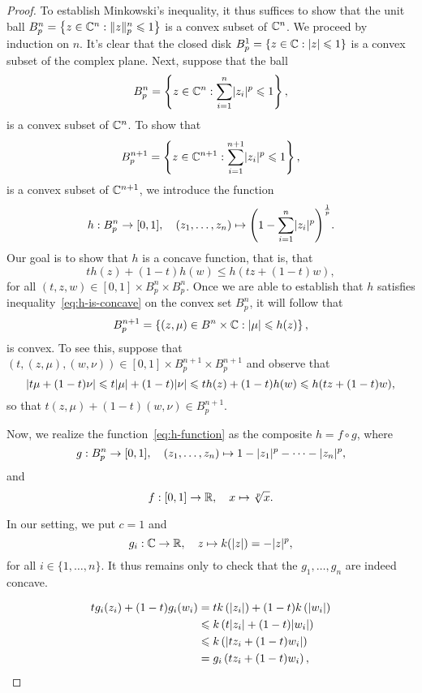 \begin{proof}
To establish Minkowski's inequality, it thus suffices to show that the unit
ball
\(B^{n}_{p}=\left\{z\in\complexfield^{n}:\norm<n>(p)[z]\leqslant{1}\right\}\)
is a convex subset of \(\mathbb{C}^{n}\). We proceed by induction on \(n\).
It's clear that the closed disk
\(B^{1}_{p}=\left\{z\in\mathbb{C}:\lvert z\rvert\leqslant{1}\right\}\) is a convex
subset of the complex plane. Next, suppose that the ball
\[
  B^{n}_{p}
  =
  \left\{z\in\mathbb{C}^{n}:\sum_{i=1}^{n}\lvert z_{i}\rvert^{p}\leqslant{1}\right\},
\]
is a convex subset of \(\mathbb{C}^{n}\). To show that
\[
  B^{n+1}_{p}
  =
  \left\{z\in\mathbb{C}^{n+1}:\sum_{i=1}^{n+1}\lvert z_{i}\rvert^{p}\leqslant{1}\right\},
\]
is a convex subset of \(\mathbb{C}^{n+1}\), we introduce the function
\begin{equation}\label{eq:h-function}
  h:B^{n}_{p}\to{[0,1]},
  \quad{(z_{1},\ldots,z_{n})\mapsto\left(1-\sum_{i=1}^{n}\lvert z_{i}\rvert^{p}\right)^{\frac{1}{p}}}.
\end{equation}
Our goal is to show that \(h\) is a concave function, that is, that
\begin{equation}\label{eq:h-is-concave}
	th(z)+(1-t)h(w)\leqslant{h(tz+(1-t)w)},
\end{equation}
for all \((t,z,w)\in{[0,1]\times{B^{n}_{p}}\times{B^{n}_{p}}}\). Once we are
able to establish that \(h\) satisfies inequality~\eqref{eq:h-is-concave} on
the convex set \(B^{n}_{p}\), it will follow that
\[
	B^{n+1}_{p}
  =
  \left\{(z,\mu)\in{B^{n}\times\mathbb{C}}:\lvert\mu\rvert\leqslant{h(z)}\right\},
\]
is convex. To see this, suppose that
\((t,(z,\mu),(w,\nu))\in{[0,1]\times{B^{n+1}_{p}}\times{B^{n+1}_{p}}}\) and
observe that
\[
	\lvert t\mu+(1-t)\nu\rvert
  \leqslant{t\lvert\mu\rvert+(1-t)\lvert\nu\rvert}
  \leqslant{th(z)+(1-t)h(w)}
  \leqslant{h(tz+(1-t)w}),
\]
so that \(t(z,\mu)+(1-t)(w,\nu)\in{B^{n+1}_{p}}\).

Now, we realize the function~\eqref{eq:h-function} as the composite
\(h=f\circ{g}\), where
\begin{equation}\label{eq:g-function}
  g:B^{n}_{p}\to[0,1],
  \quad{(z_{1},\ldots,z_{n})\mapsto{1-\lvert z_{1}\rvert^{p}-\cdots-\lvert z_{n}\rvert^{p}}},
\end{equation}
and
\begin{equation}\label{eq:f-function}
  f:[0,1]\to\mathbb{R},\quad{x\mapsto{\sqrt[p]{x}}}.
\end{equation}

In our setting, we put \(c=1\) and
\[
  g_{i}:\mathbb{C}\to\mathbb{R},\quad{z\mapsto{k(\lvert z\rvert)=-\lvert z\rvert^{p}}},
\]
for all \(i\in\{1,\ldots,n\}\). It thus remains only to check that
the \(g_{1},\ldots,g_{n}\) are indeed concave.

\begin{align*}
  tg_{i}(z_{i})+(1-t)g_{i}(w_{i})
  &=
  tk\left(\lvert z_{i}\rvert\right)+(1-t)k\left(\lvert w_{i}\rvert\right)
  \\
  &\leqslant
  k\left(t\lvert z_{i}\rvert+(1-t)\lvert w_{i}\rvert\right)
  \\
  &\leqslant
  k\left(\lvert tz_{i}+(1-t)w_{i}\rvert\right)
  \\
  &=
  g_{i}\left(tz_{i}+(1-t)w_{i}\right),
\end{align*}
\end{proof}


